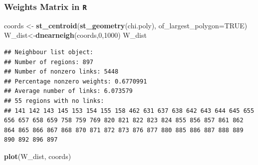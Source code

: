 \documentclass[
  shownotes,
  xcolor={svgnames},
  hyperref={colorlinks,citecolor=DarkBlue,linkcolor=DarkRed,urlcolor=DarkBlue}
  ]{beamer}
\newenvironment{Shaded}{\begin{snugshade}}{\end{snugshade}}
\newcommand{\DataTypeTok}[1]{\textcolor[rgb]{0.13,0.29,0.53}{#1}}
\newcommand{\DecValTok}[1]{\textcolor[rgb]{0.00,0.00,0.81}{#1}}
\newcommand{\KeywordTok}[1]{\textcolor[rgb]{0.13,0.29,0.53}{\textbf{#1}}}
\newcommand{\NormalTok}[1]{#1}
\newcommand{\OtherTok}[1]{\textcolor[rgb]{0.56,0.35,0.01}{#1}}
\newcommand{\StringTok}[1]{\textcolor[rgb]{0.31,0.60,0.02}{#1}}
\begin{document}
\begin{frame}[fragile]
\frametitle{Weights Matrix in \texttt{R}}


\begin{scriptsize}
\begin{Shaded}
\begin{Highlighting}[]
\NormalTok{coords \textless{}{-}}\StringTok{ }\KeywordTok{st\_centroid}\NormalTok{(}\KeywordTok{st\_geometry}\NormalTok{(chi.poly), }\DataTypeTok{of\_largest\_polygon=}\OtherTok{TRUE}\NormalTok{)}
\NormalTok{W\_dist\textless{}{-}}\KeywordTok{dnearneigh}\NormalTok{(coords,}\DecValTok{0}\NormalTok{,}\DecValTok{1000}\NormalTok{)}
\NormalTok{W\_dist}
\end{Highlighting}
\end{Shaded}
\end{scriptsize}
\begin{tiny}
\begin{verbatim}
## Neighbour list object:
## Number of regions: 897 
## Number of nonzero links: 5448 
## Percentage nonzero weights: 0.6770991 
## Average number of links: 6.073579 
## 55 regions with no links:
## 141 142 143 145 153 154 155 158 462 631 637 638 642 643 644 645 655 656 657 658 659 758 759 769 820 821 822 823 824 855 856 857 861 862 864 865 866 867 868 870 871 872 873 876 877 880 885 886 887 888 889 890 892 896 897
\end{verbatim}

\end{tiny}


\begin{scriptsize}
\begin{Shaded}
\begin{Highlighting}[]
\KeywordTok{plot}\NormalTok{(W\_dist, coords)}
\end{Highlighting}
\end{Shaded}

\end{scriptsize}



\end{frame}
\end{document}
